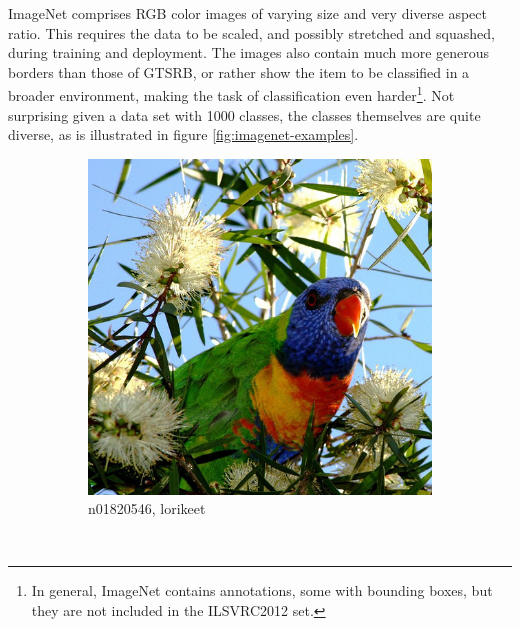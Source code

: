 \documentclass[11pt, a4paper]{article}
\begin{document}
ImageNet comprises RGB color images of varying size and very diverse aspect ratio. This requires the data to be scaled, and possibly stretched and squashed, during training and deployment. The images also contain much more generous borders than those of GTSRB, or rather show the item to be classified in a broader environment, making the task of classification even harder\footnote{In general, ImageNet contains annotations, some with bounding boxes, but they are not included in the ILSVRC2012 set.}. Not surprising given a data set with 1000 classes, the classes themselves are quite diverse, as is illustrated in figure \ref{fig:imagenet-examples}.

\begin{figure}[h!tb]
    \centering
    \begin{subfigure}[t]{0.30\textwidth}
    		\centering
        \includegraphics[width=\textwidth]{imagenet/examples/n01820546_31.JPEG}
        \caption{n01820546, lorikeet}
        \label{fig:imagenet-examples-1}
    \end{subfigure}
    ~ %
    \begin{subfigure}[t]{0.30\textwidth}
    		\centering

\end{subfigure}
\end{figure}
\end{document}
